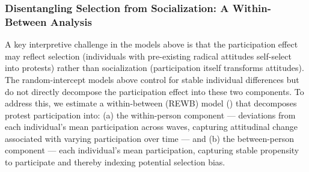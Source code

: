 \documentclass[
  13pt,
]{article}
\begin{document}
\subsubsection{Disentangling Selection from Socialization: A
Within-Between
Analysis}\label{disentangling-selection-from-socialization-a-within-between-analysis}

A key interpretive challenge in the models above is that the
participation effect may reflect selection (individuals with
pre-existing radical attitudes self-select into protests) rather than
socialization (participation itself transforms attitudes). The
random-intercept models above control for stable individual differences
but do not directly decompose the participation effect into these two
components. To address this, we estimate a within-between (REWB) model
() that
decomposes protest participation into: (a) the within-person component
--- deviations from each individual's mean participation across waves,
capturing attitudinal change associated with varying participation over
time --- and (b) the between-person component --- each individual's mean
participation, capturing stable propensity to participate and thereby
indexing potential selection bias.
\end{document}
